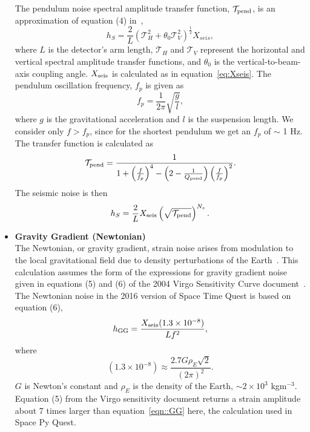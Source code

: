 \documentclass{article}
\begin{document}
\begin{itemize}
    The pendulum noise spectral amplitude transfer function,
    $\mathcal{T}_{\rm pend}$, is an approximation of equation (4)
    in~\cite{Virgo-sens},
    \begin{equation}
    h_{S} = \frac{2}{L}\left(\mathcal{T}_{H}^2 + \theta_0\mathcal{T}_V^2\right)^{\frac{1}{2}}X_{seis},
    \end{equation}
    where $L$ is the detector's arm length, $\mathcal{T}_H$ and
    $\mathcal{T}_V$ represent the horizontal and vertical spectral
    amplitude transfer functions, and $\theta_0$ is the
    vertical-to-beam-axis coupling angle. $X_{\rm seis}$ is calculated as
    in equation~\ref{eq:Xseis}.
    The pendulum oscillation frequency, $f_{p}$ is given as
    \begin{equation}
    f_{p} = \frac{1}{2\pi}\sqrt{\frac{g}{l}} ,
    \end{equation} 
    where $g$ is the gravitational acceleration and $l$ is the
    suspension length. We consider only $f > f_p$, since for the
    shortest pendulum we get an $f_p$ of $\sim$ 1 Hz. The transfer
    function is calculated as
    \begin{equation}
    \mathcal{T}_{\rm pend} = \frac{1}{1 + \left(\frac{f}{f_{p}}\right)^4 - \left(2 - \frac{1}{Q_{\rm pend}}\right)\left(\frac{f}{f_{p}}\right)^2}.
    \end{equation}
        The seismic noise is then
    \begin{equation}
        \label{eqn::seismic}
        h_{S} = \frac{2}{L}X_{\rm seis}\left(\sqrt{\mathcal{T}_{\rm pend}}\right)^{N_s}.
    \end{equation}
    \item \textbf{Gravity Gradient (Newtonian)} \\
    The Newtonian, or gravity gradient, strain noise arises from
    modulation to the local gravitational field due to density
    perturbations of the Earth~\cite{advLIGO}. This calculation
    assumes the form of the expressions for gravity gradient noise
    given in equations (5) and (6) of the 2004 Virgo Sensitivity Curve
    document~\cite{Virgo-sens}. The Newtonian noise in the 2016 version of
    Space Time Quest is based on equation (6),
    \begin{equation}
    \label{eqn::GG}
    h_{\rm GG} = \frac{X_{\rm seis}(1.3\times10^{-8})}{Lf^2},
    \end{equation}
    where
    \begin{equation}
    (1.3\times10^{-8}) \approx \frac{2.7G\rho_E\sqrt{2}}{(2\pi)^2}.
    \end{equation}
   $G$ is Newton's constant and $\rho_E$ is the density of the Earth,
   $\sim 2 \times 10^3$ kgm$^{-3}$. Equation (5) from the Virgo
   sensitivity document returns a strain amplitude about 7 times
   larger than equation~\ref{eqn::GG} here, the calculation used in
   Space Py Quest.
   \end{itemize}
\end{document}
